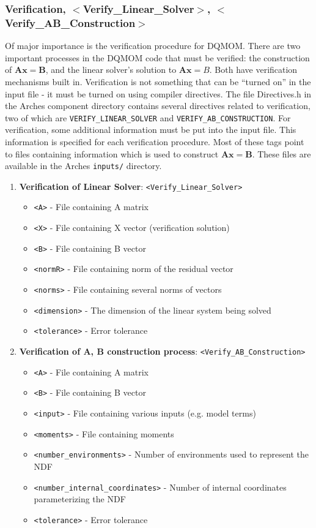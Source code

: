 \subsubsection{Verification, $<$Verify\_Linear\_Solver$>$, $<$Verify\_AB\_Construction$>$}
%
Of major importance is the verification procedure for DQMOM. There are two important processes in the DQMOM code that must be verified: the construction of $\mathbf{Ax}=\mathbf{B}$, and the linear solver's solution to $\mathbf{Ax}={B}$. Both have verification mechanisms built in.
%
Verification is not something that can be ``turned on'' in the input file - it must be turned on using compiler directives.  The file Directives.h in the Arches component directory contains several directives related to verification, two of which are \verb=VERIFY_LINEAR_SOLVER= and \verb=VERIFY_AB_CONSTRUCTION=.
%
For verification, some additional information must be put into the input file. This information is specified for each verification procedure. Most of these tags point to files containing information which is used to construct $\mathbf{Ax}=\mathbf{B}$. These files are available in the Arches \verb=inputs/= directory.
%
\begin{enumerate}
%
\item {\bf Verification of Linear Solver}: \verb=<Verify_Linear_Solver>= \\
	\begin{itemize}
	\item \verb=<A>= - File containing A matrix
	\item \verb=<X>= - File containing X vector (verification solution)
	\item \verb=<B>= - File containing B vector
	\item \verb=<normR>= - File containing norm of the residual vector
	\item \verb=<norms>= - File containing several norms of vectors
	\item \verb=<dimension>= - The dimension of the linear system being solved
	\item \verb=<tolerance>= - Error tolerance
	\end{itemize}
%
\item {\bf Verification of A, B construction process}: \verb=<Verify_AB_Construction>= \\
	\begin{itemize}
	\item \verb=<A>= - File containing A matrix
	\item \verb=<B>= - File containing B vector
	\item \verb=<input>= - File containing various inputs (e.g. model terms)
	\item \verb=<moments>= - File containing moments
	\item \verb=<number_environments>= - Number of environments used to represent the NDF
	\item \verb=<number_internal_coordinates>= - Number of internal coordinates parameterizing the NDF
	\item \verb=<tolerance>= - Error tolerance
	\end{itemize}
%
\end{enumerate}



